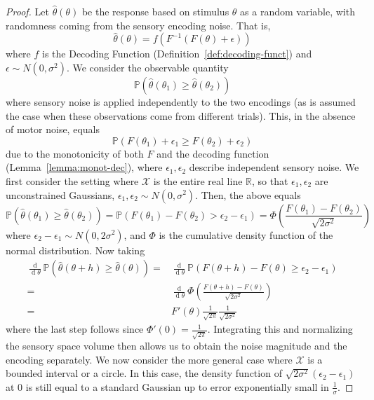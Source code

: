 \begin{proof}
    Let $\widehat{\theta}(\theta)$ be the response based on stimulus $\theta$ as a random variable, with randomness coming from the sensory encoding noise.
    That is,
    \begin{equation}
        \widehat{\theta}(\theta) = f(F^{-1}(F(\theta) + \epsilon))
    \end{equation}
    where $f$ is the Decoding Function (Definition~\ref{def:decoding-funct}) and $\epsilon \sim N(0,\sigma^2)$.
    We consider the observable quantity
\begin{equation}
\mathbb{P}\left(\widehat{\theta}(\theta_1) \geq \widehat{\theta}(\theta_2)\right)
\end{equation}
where sensory noise is applied independently to the two encodings (as is assumed the case when these observations come from different trials).
This, in the absence of motor noise, equals
\begin{equation}
\mathbb{P}\left(F(\theta_1) + \epsilon_1 \geq F(\theta_2) + \epsilon_2\right)
\end{equation}
due to the monotonicity of both $F$ and the decoding function (Lemma~\ref{lemma:monot-dec}), where $\epsilon_1, \epsilon_2$ describe independent sensory noise.
We first consider the setting where $\mathcal{X}$ is the entire real line $\mathbb{R}$, so that $\epsilon_1, \epsilon_2$ are unconstrained Gaussians, $\epsilon_1, \epsilon_2 \sim N(0,\sigma^2)$.
Then, the above equals
\begin{equation}\label{eq:comparison-encodings-cumulative}
\mathbb{P}\left(\widehat{\theta}(\theta_1) \geq \widehat{\theta}(\theta_2)\right) = \mathbb{P}\left(F(\theta_1) - F(\theta_2) > \epsilon_2-\epsilon_1\right) = \Phi\left(\frac{F(\theta_1) - F(\theta_2)}{\sqrt{2\sigma^2}}\right)
\end{equation}
where $\epsilon_2-\epsilon_1 \sim N(0,2\sigma^2)$, and $\Phi$ is the cumulative density function of the normal distribution. 
Now taking
\begin{align*}
 \frac{\operatorname{d}}{\operatorname{d}\theta}  \mathbb{P}(\widehat{\theta}(\theta+h) \geq \widehat{\theta}(\theta)) 
= & \frac{\operatorname{d}}{\operatorname{d}\theta}  \mathbb{P}(F(\theta+h) - F(\theta) \geq \epsilon_2-\epsilon_1) \\
    =&  \frac{\operatorname{d}}{\operatorname{d}\theta}  \Phi\left(\frac{F(\theta+h) - F(\theta)}{\sqrt{2\sigma^2}}\right) \\
    = & F'(\theta) \frac{1}{\sqrt{2\pi}} \frac{1}{\sqrt{2\sigma^2}}
\end{align*}
where the last step follows since $\Phi'(0) = \frac{1}{\sqrt{2\pi}}$.
Integrating this and normalizing the sensory space volume then allows us to obtain the noise magnitude and the encoding separately.
We now consider the more general case where $\mathcal{X}$ is a bounded interval or a circle. In this case, the density function of $\sqrt{2\sigma^2}\left(\epsilon_2-\epsilon_1\right)$ at 0 is still equal to a standard Gaussian up to error exponentially small in $\frac{1}{\sigma}$.
\end{proof}

